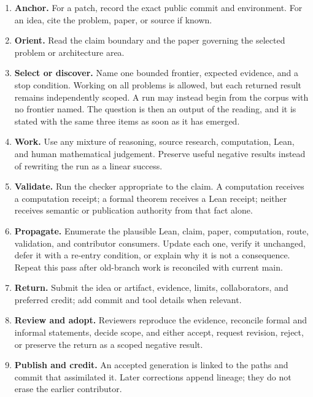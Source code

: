 \documentclass[10pt]{article}
\begin{document}
\begin{enumerate}
\item \textbf{Anchor.} For a patch, record the exact public commit and
environment. For an idea, cite the problem, paper, or source if known.
\item \textbf{Orient.}  Read the claim boundary and the paper governing the
      selected problem or architecture area.
\item \textbf{Select or discover.}  Name one bounded frontier, expected
      evidence, and a stop condition.  Working on all problems is allowed, but
      each returned result remains independently scoped.  A run may instead
      begin from the corpus with no frontier named.  The question is then an
      output of the reading, and it is stated with the same three items as
      soon as it has emerged.
\item \textbf{Work.}  Use any mixture of reasoning, source research,
      computation, Lean, and human mathematical judgement.  Preserve useful
      negative results instead of rewriting the run as a linear success.
\item \textbf{Validate.}  Run the checker appropriate to the claim.  A
      computation receives a computation receipt; a formal theorem receives a
      Lean receipt; neither receives semantic or publication authority from
      that fact alone.
\item \textbf{Propagate.}  Enumerate the plausible Lean, claim, paper,
      computation, route, validation, and contributor consumers.  Update each
      one, verify it unchanged, defer it with a re-entry condition, or explain
      why it is not a consequence.  Repeat this pass after old-branch work is
      reconciled with current main.
\item \textbf{Return.} Submit the idea or artifact, evidence, limits,
collaborators, and preferred credit; add commit and tool details when relevant.
\item \textbf{Review and adopt.}  Reviewers reproduce the evidence, reconcile
      formal and informal statements, decide scope, and either accept, request
      revision, reject, or preserve the return as a scoped negative result.
\item \textbf{Publish and credit.}  An accepted generation is linked to the
      paths and commit that assimilated it.  Later corrections append lineage;
      they do not erase the earlier contributor.
\end{enumerate}
\end{document}
